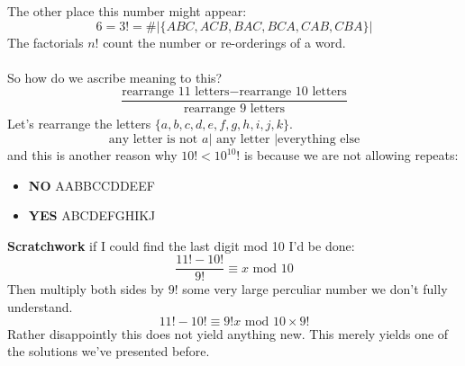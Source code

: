 \documentclass[12pt]{article}
\begin{document}
\newpage

\noindent The other place this number might appear:
$$ 6 = 3! = \# \big| \{ ABC, ACB, BAC, BCA, CAB, CBA \} \big|$$
The factorials $n!$ count the number or re-orderings of a word. \\ \\ So how do we ascribe meaning to this? \\
$$  \frac{ \text{rearrange 11 letters}
- \text{rearrange 10 letters}}{ \text{rearrange 9 letters}}$$
Let's rearrange the letters $\{ a,b,c,d,e,f,g,h,i,j,k\}$.
$$  \text{any letter is not }a \Big| \text{ any letter } \Big| \text{everything else} $$
and this is another reason why $\boxed{10! < 10^{10}!}$ is because we are not allowing repeats: \\
\begin{itemize}
\item \textbf{NO} AABBCCDDEEF
\item \textbf{YES} ABCDEFGHIKJ
\end{itemize}

\newpage

\noindent \textbf{Scratchwork} if I could find the last digit mod 10 I'd be done:
$$ \frac{11! - 10!}{9!}  \equiv x \text{ mod } 10 $$
Then multiply both sides by $9!$ some very large perculiar number we don't fully understand.
$$ 11! - 10!  \equiv 9! x \text{ mod } 10 \times 9!$$
Rather disappointly this does not yield anything new.  This merely yields one of the solutions we've presented before.
\end{document}
